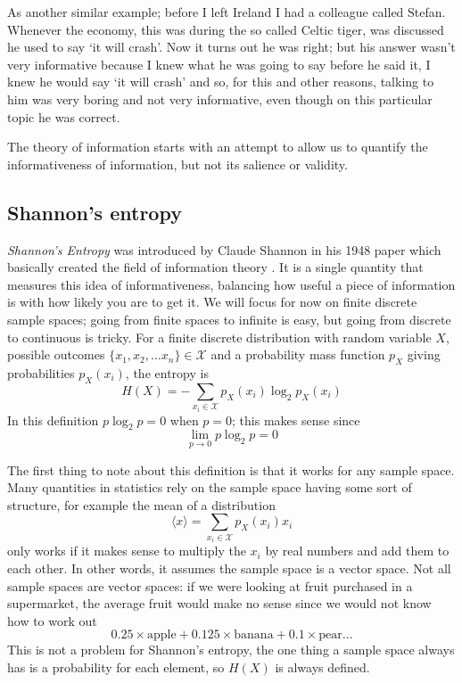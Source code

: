 \documentclass[12pt]{article}
\begin{document}
As another similar example; before I left Ireland I had a colleague
called Stefan. Whenever the economy, this was during the so called
Celtic tiger, was discussed he used to say \lq{}it will
crash\rq{}. Now it turns out he was right; but his answer wasn't very
informative because I knew what he was going to say before he said it,
I knew he would say \lq{}it will crash\rq{} and so, for this and other
reasons, talking to him was very boring and not very informative, even
though on this particular topic he was correct.

The theory of information starts with an attempt to allow us to
quantify the informativeness of information, but not its salience or
validity.

\subsection*{Shannon's entropy}


\textsl{Shannon's Entropy} was introduced by Claude Shannon in his
1948 paper which basically created the field of information theory
\citep{Shannon1948}. It is a single quantity that measures this idea of
informativeness, balancing how useful a piece of information is with
how likely you are to get it. We will focus for now on finite discrete
sample spaces; going from finite spaces to infinite is easy, but going
from discrete to continuous is tricky. For a finite discrete
distribution with random variable $X$, possible outcomes
$\{x_1,x_2,\ldots x_n\}\in\mathcal{X}$ and a probability mass function
$p_X$ giving probabilities $p_X(x_i)$, the entropy is
\begin{equation}
H(X)=-\sum_{x_i\in \mathcal{X}}{p_X(x_i)\log_2p_X(x_i)}
\end{equation}
In this definition $p\log_2{p}=0$ when $p=0$; this makes sense since
\begin{equation}
\lim_{p\rightarrow 0}p\log_2{p}=0
\end{equation}

The first thing to note about this definition is that it works for any
sample space. Many quantities in statistics rely on the sample space
having some sort of structure, for example the mean of a distribution
\begin{equation}
\langle x\rangle = \sum_{x_i\in \mathcal{X}}{p_X(x_i)x_i}
\end{equation}
only works if it makes sense to multiply the $x_i$ by real numbers and
add them to each other. In other words, it assumes the sample space is
a vector space. Not all sample spaces are vector spaces: if we were
looking at fruit purchased in a supermarket, the average fruit would
make no sense since we would not know how to work out
\begin{equation}
0.25\times \mbox{apple}+0.125\times \mbox{banana}+0.1\times \mbox{pear}\ldots
\end{equation}
This is not a problem for Shannon's entropy, the one
thing a sample space always has is a probability for each element, so
$H(X)$ is always defined.
\end{document}
